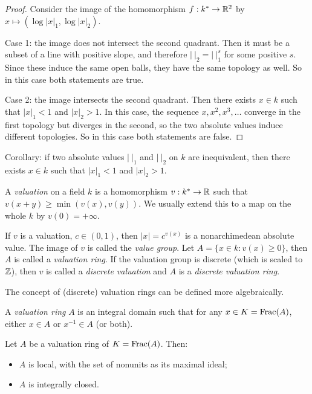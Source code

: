 \documentclass[11pt]{amsart}
\begin{document}
\begin{proof}
Consider the image of the homomorphism $f: k^* \to \mathbb{R}^2$ by $x \mapsto (\log |x|_1, \log |x|_2)$.

Case 1: the image does not intersect the second quadrant. Then it must be a subset of a line with positive slope, and therefore $|\ |_2 = |\ |_1^s$ for some positive $s$. Since these induce the same open balls, they have the same topology as well. So in this case both statements are true.

Case 2: the image intersects the second quadrant. Then there exists $x\in k$ such that $|x|_1 < 1$ and $|x|_2 > 1$. In this case, the sequence $x, x^2, x^3,\dots$ converge in the first topology but diverges in the second, so the two absolute values induce different topologies. So in this case both statements are false.
\end{proof}

Corollary: if two absolute values $|\ |_1$ and $|\ |_2$ on $k$ are inequivalent, then there exists $x\in k$ such that $|x|_1 < 1$ and $|x|_2 > 1$.

\begin{defn}
A \emph{valuation} on a field $k$ is a homomorphism $v:k^* \to \mathbb{R}$ such that $v(x+y) \ge \min(v(x), v(y))$. We usually extend this to a map on the whole $k$ by $v(0) = +\infty$.
\end{defn}

If $v$ is a valuation, $c \in (0,1)$, then $|x| = c^{v(x)}$ is a nonarchimedean absolute value. The image of $v$ is called the \emph{value group}. Let $A = \{x\in k: v(x) \ge 0\}$, then $A$ is called a \emph{valuation ring}. If the valuation group is discrete (which is scaled to $\mathbb{Z}$), then $v$ is called a \emph{discrete valuation} and $A$ is a \emph{discrete valuation ring}.

The concept of (discrete) valuation rings can be defined more algebraically.

\begin{defn}
A \emph{valuation ring} $A$ is an integral domain such that for any $x\in K = \operatorname{Frac}(A)$, either $x\in A$ or $x^{-1} \in A$ (or both).
\end{defn}

\begin{prop}
Let $A$ be a valuation ring of $K = \operatorname{Frac}(A)$. Then:
\begin{itemize}
    \item $A$ is local, with the set of nonunits as its maximal ideal;
    \item $A$ is integrally closed.
\end{itemize}
\end{prop}
\end{document}
